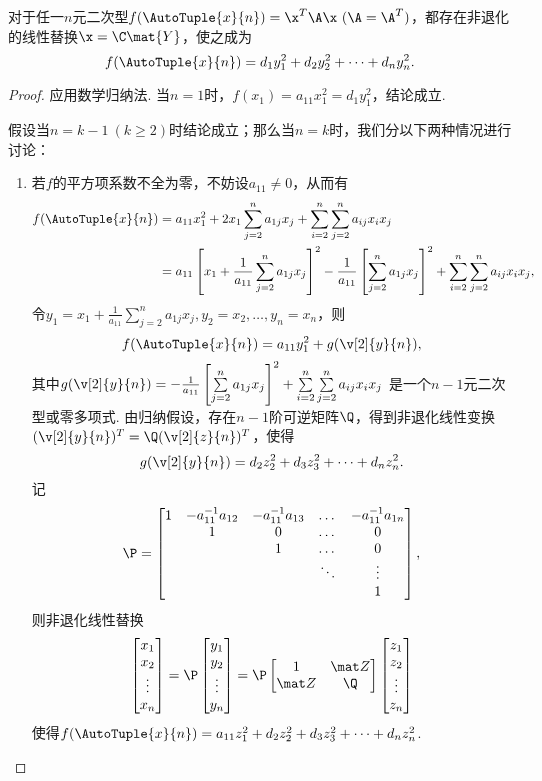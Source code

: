 \begin{theorem}
对于任一\(n\)元二次型\(f(\AutoTuple{x}{n})=\x^T\A\x\ (\A=\A^T)\)，都存在非退化的线性替换\(\x=\C\mat{Y}\)，使之成为\[
f(\AutoTuple{x}{n})=d_1 y_1^2 + d_2 y_2^2 + \dotsb + d_n y_n^2.
\]
\begin{proof}
应用数学归纳法.
当\(n=1\)时，\(f(x_1) = a_{11} x_1^2 = d_1 y_1^2\)，结论成立.

假设当\(n=k-1\ (k\geqslant2)\)时结论成立；那么当\(n=k\)时，我们分以下两种情况进行讨论：
\begin{enumerate}
\item 若\(f\)的平方项系数不全为零，不妨设\(a_{11}\neq0\)，从而有\begin{align*}
f(\AutoTuple{x}{n}) &= a_{11} x_1^2 + 2 x_1 \sum\limits_{j=2}^n a_{1j} x_j + \sum\limits_{i=2}^n \sum\limits_{j=2}^n a_{ij} x_i x_j \\
&= a_{11} \left[
	x_1 + \frac{1}{a_{11}} \sum\limits_{j=2}^n a_{1j} x_j
\right]^2
- \frac{1}{a_{11}} \left[
	\sum\limits_{j=2}^n a_{1j} x_j
\right]^2
+ \sum\limits_{i=2}^n \sum\limits_{j=2}^n a_{ij} x_i x_j,
\end{align*}
令\(y_1 = x_1 + \frac{1}{a_{11}} \sum\limits_{j=2}^n a_{1j} x_j,
y_2 = x_2,
\dotsc,
y_n = x_n\)，则\[
f(\AutoTuple{x}{n}) = a_{11} y_1^2 + g(\v[2]{y}{n}),
\]
其中\(g(\v[2]{y}{n})
= - \frac{1}{a_{11}} \left[
	\sum\limits_{j=2}^n a_{1j} x_j
\right]^2
+ \sum\limits_{i=2}^n \sum\limits_{j=2}^n a_{ij} x_i x_j\)%
是一个\(n-1\)元二次型或零多项式.
由归纳假设，存在\(n-1\)阶可逆矩阵\(\Q\)，得到非退化线性变换\((\v[2]{y}{n})^T = \Q (\v[2]{z}{n})^T\)，使得\[
g(\v[2]{y}{n})
= d_2 z_2^2 + d_3 z_3^2 + \dotsb + d_n z_n^2.
\]
记\[
\P = \begin{bmatrix}
1 & -a_{11}^{-1} a_{12} & -a_{11}^{-1} a_{13} & \dots & -a_{11}^{-1} a_{1n} \\
& 1 & 0 & \dots & 0 \\
& & 1 & \dots & 0 \\
& & & \ddots & \vdots \\
& & & & 1
\end{bmatrix},
\]则非退化线性替换\[
\begin{bmatrix}
x_1 \\ x_2 \\ \vdots \\ x_n
\end{bmatrix}
= \P \begin{bmatrix}
y_1 \\ y_2 \\ \vdots \\ y_n
\end{bmatrix}
= \P \begin{bmatrix} 1 & \z \\ \z & \Q \end{bmatrix} \begin{bmatrix}
z_1 \\ z_2 \\ \vdots \\ z_n
\end{bmatrix}
\]使得\(f(\AutoTuple{x}{n}) = a_{11} z_1^2 + d_2 z_2^2 + d_3 z_3^2 + \dotsb + d_n z_n^2\).


\end{enumerate}
\end{proof}
\end{theorem}
